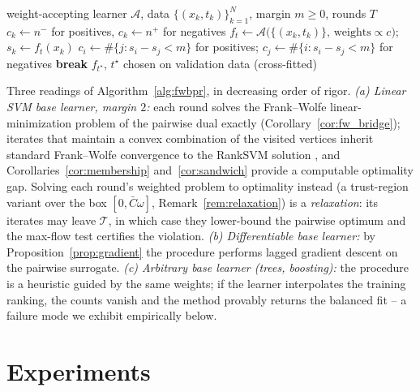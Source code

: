 \documentclass[11pt]{article}
\theoremstyle{remark}
\begin{document}
\begin{algorithm}[t]
\caption{FW-BPR: iteratively reweighted bipartite ranking}
\label{alg:fwbpr}
\begin{algorithmic}[1]
\REQUIRE weight-accepting learner $\mathcal{A}$, data
$\{(x_k, t_k)\}_{k=1}^N$, margin $m \ge 0$, rounds $T$
\STATE $c_k \leftarrow n^-$ for positives, $c_k \leftarrow n^+$ for
negatives 
  \STATE $f_t \leftarrow \mathcal{A}\bigl(\{(x_k, t_k)\},\,
  \mathrm{weights} \propto c\bigr)$; \quad $s_k \leftarrow f_t(x_k)$
  \STATE $c_i \leftarrow \#\{ j : s_i - s_j < m \}$ for positives;\quad
  $c_j \leftarrow \#\{ i : s_i - s_j < m \}$ for negatives
   \STATE \textbf{break}
  \ENDIF
\ENDFOR
\RETURN $f_{t^\star}$, $t^\star$ chosen on validation data (cross-fitted)
\end{algorithmic}
\end{algorithm}

Three readings of Algorithm~\ref{alg:fwbpr}, in decreasing order of rigor.
\emph{(a) Linear SVM base learner, margin $2$:} each round solves the
Frank--Wolfe linear-minimization problem of the pairwise dual exactly
(Corollary~\ref{cor:fw_bridge}); iterates that maintain a convex combination
of the visited vertices inherit standard Frank--Wolfe convergence to the
RankSVM solution \citep{jaggi2013,lacostejulien2013}, and
Corollaries~\ref{cor:membership} and~\ref{cor:sandwich} provide a computable
optimality gap. Solving each round's weighted problem to optimality instead
(a trust-region variant over the box $[0, \bar{C}\omega]$,
Remark~\ref{rem:relaxation}) is a \emph{relaxation}: its iterates may leave
$\mathcal{T}$, in which case they lower-bound the pairwise optimum and the
max-flow test certifies the violation. \emph{(b) Differentiable base
learner:} by Proposition~\ref{prop:gradient} the procedure performs lagged
gradient descent on the pairwise surrogate. \emph{(c) Arbitrary base learner
(trees, boosting):} the procedure is a heuristic guided by the same weights;
if the learner interpolates the training ranking, the counts vanish and the
method provably returns the balanced fit -- a failure mode we exhibit
empirically below.

\section{Experiments}
\label{sec:experiments}
\end{document}
